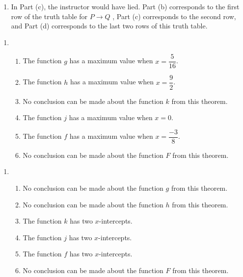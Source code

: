 \begin{enumerate}
\item In Part (c), the instructor would have lied.  Part (b) corresponds to the first row of the truth table for $P \to Q$ , Part (c) corresponds to the second row, and Part (d) corresponds to the last two rows of this truth table.
\end{enumerate}


\begin{enumerate}
\item \begin{enumerate} 
\item The function $g$ has a maximum value when $x = \dfrac{5}{16}$.

\item The function $h$ has a maximum value when $x = \dfrac{9}{2}$.

\item No conclusion can be made about the function $k$ from this theorem.

\item The function $j$ has a maximum value when $x = 0$.

\item The function $f$ has a maximum value when $x = \dfrac{-3}{8}$.

\item No conclusion can be made about the function $F$ from this theorem.
\end{enumerate}
\end{enumerate}





\begin{enumerate}
\item \begin{enumerate}  
\item No conclusion can be made about the function $g$ from this theorem.

\item No conclusion can be made about the function $h$ from this theorem.

\item The function $k$ has two $x$-intercepts.

\item The function $j$ has two $x$-intercepts.

\item The function $f$ has two $x$-intercepts.

\item No conclusion can be made about the function $F$ from this theorem.
\end{enumerate}
\end{enumerate}



